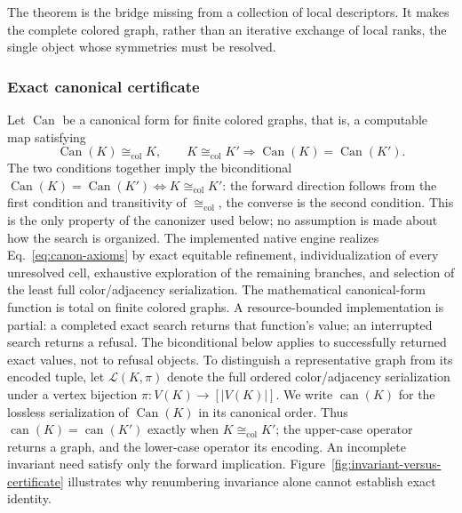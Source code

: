 \documentclass[pdflatex,sn-mathphys-num,referee,lineno]{sn-jnl}
\theoremstyle{plain}
\theoremstyle{remark}
\theoremstyle{definition}
\begin{document}
The theorem is the bridge missing from a collection of local descriptors.  It
makes the complete colored graph, rather than an iterative exchange of local
ranks, the single object whose symmetries must be resolved.

\subsubsection{Exact canonical certificate}
\label{sec:certificate}

Let \(\operatorname{Can}\) be a canonical form for finite colored graphs, that
is, a computable map satisfying
\begin{equation}
  \operatorname{Can}(K)\cong_{\mathrm{col}}K,
  \qquad
  K\cong_{\mathrm{col}}K'
  \Longrightarrow
  \operatorname{Can}(K)=\operatorname{Can}(K') .
  \label{eq:canon-axioms}
\end{equation}
The two conditions together imply the biconditional
\(\operatorname{Can}(K)=\operatorname{Can}(K')\iff K\cong_{\mathrm{col}}K'\):
the forward direction follows from the first condition and transitivity of
\(\cong_{\mathrm{col}}\), the converse is the second condition.  This is the
only property of the canonizer used below; no assumption is made about how the
search is organized.  The implemented native engine realizes
Eq.~\eqref{eq:canon-axioms} by exact equitable refinement, individualization of
every unresolved cell, exhaustive exploration of the remaining branches, and
selection of the least full color/adjacency serialization. The mathematical
canonical-form function is total on finite colored graphs. A resource-bounded
implementation is partial: a completed exact search returns that function's
value; an interrupted search returns a refusal. The biconditional below
applies to successfully returned exact values, not to refusal objects.
To distinguish a representative graph from its encoded tuple, let
\(\mathcal L(K,\pi)\) denote the full ordered color/adjacency serialization
under a vertex bijection \(\pi:V(K)\to[|V(K)|]\). We write
\(\operatorname{can}(K)\) for the lossless serialization of
\(\operatorname{Can}(K)\) in its canonical order. Thus
\(\operatorname{can}(K)=\operatorname{can}(K')\) exactly when
\(K\cong_{\mathrm{col}}K'\); the upper-case operator returns a graph, and the
lower-case operator its encoding. An incomplete invariant need satisfy only
the forward implication. Figure~\ref{fig:invariant-versus-certificate}
illustrates why renumbering invariance alone cannot establish exact identity.
\end{document}

